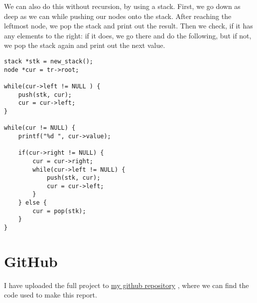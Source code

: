 \documentclass[a4paper,11pt]{article}
\newcommand{\underlinehref}[2]{%
    \href{#1}{\ul{#2}}%
}
\begin{document}
    We can also do this without recursion, by using a stack.
    First, we go down as deep as we can while pushing our nodes onto the stack.
    After reaching the leftmost node, we pop the stack and print out the result.
    Then we check, if it has any elements to the right:
    if it does, we go there and do the following, but if not, we pop the stack again and print out the next value.
    \begin{verbatim}
stack *stk = new_stack();
node *cur = tr->root;
    
while(cur->left != NULL ) {
    push(stk, cur);
    cur = cur->left;
}

while(cur != NULL) {
    printf("%d ", cur->value);

    if(cur->right != NULL) {
        cur = cur->right;
        while(cur->left != NULL) {
            push(stk, cur);
            cur = cur->left;
        }
    } else {
        cur = pop(stk);
    }
}
    \end{verbatim}


    \section*{GitHub}
    I have uploaded the full project to \underlinehref{https://github.com/peterherczku/ID1021/tree/main/assignment-7}{my github repository}, where we can find the code used to make this report.
\end{document}
